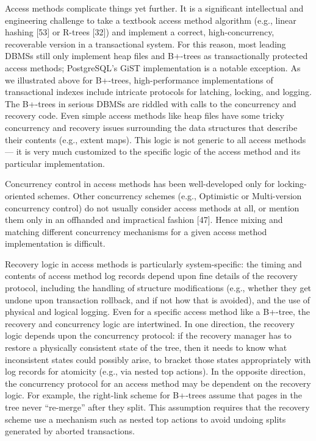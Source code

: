 \documentclass[a4paper,11pt,twoside,openright]{book}
\begin{document}
Access methods complicate things yet further. It is a significant
intellectual and engineering challenge to take a textbook access method
algorithm (e.g., linear hashing {[}53{]} or R-trees {[}32{]}) and
implement a correct, high-concurrency, recoverable version in a
transactional system. For this reason, most leading DBMSs still only
implement heap files and B+-trees as transactionally protected access
methods; PostgreSQL's GiST implementation is a notable exception. As we
illustrated above for B+-trees, high-performance implementations of
transactional indexes include intricate protocols for latching, locking,
and logging. The B+-trees in serious DBMSs are riddled with calls to the
concurrency and recovery code. Even simple access methods like heap
files have some tricky concurrency and recovery issues surrounding the
data structures that describe their contents (e.g., extent maps). This
logic is not generic to all access methods --- it is very much
customized to the specific logic of the access method and its particular
implementation.

Concurrency control in access methods has been well-developed only for
locking-oriented schemes. Other concurrency schemes (e.g., Optimistic or
Multi-version concurrency control) do not usually consider access
methods at all, or mention them only in an offhanded and impractical
fashion {[}47{]}. Hence mixing and matching different concurrency
mechanisms for a given access method implementation is difficult.

Recovery logic in access methods is particularly system-specific: the
timing and contents of access method log records depend upon fine
details of the recovery protocol, including the handling of structure
modifications (e.g., whether they get undone upon transaction rollback,
and if not how that is avoided), and the use of physical and logical
logging. Even for a specific access method like a B+-tree, the recovery
and concurrency logic are intertwined. In one direction, the recovery
logic depends upon the concurrency protocol: if the recovery manager has
to restore a physically consistent state of the tree, then it needs to
know what inconsistent states could possibly arise, to bracket those
states appropriately with log records for atomicity (e.g., via nested
top actions). In the opposite direction, the concurrency protocol for an
access method may be dependent on the recovery logic. For example, the
right-link scheme for B+-trees assume that pages in the tree never
``re-merge'' after they split. This assumption requires that the
recovery scheme use a mechanism such as nested top actions to avoid
undoing splits generated by aborted transactions.
\end{document}

